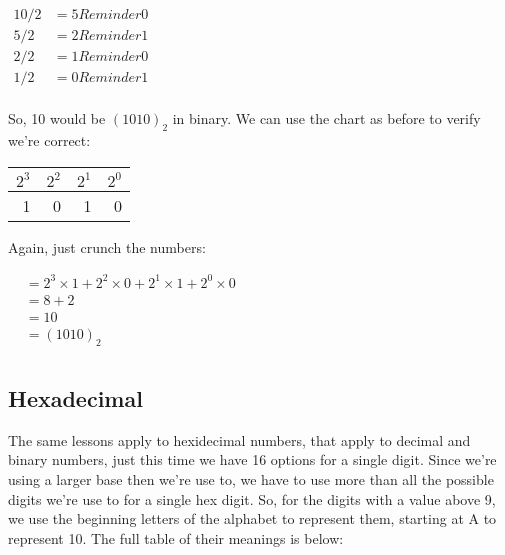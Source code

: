 \begin{center}
  \begin{math}
    \begin{aligned}
10/2 &= 5 Reminder 0 \\
5/2 &= 2 Reminder 1 \\
2/2 &= 1 Reminder 0 \\
1/2 &= 0 Reminder 1 \\
    \end{aligned}
  \end{math}
\end{center}

So, 10 would be $(1010)_2$ in binary. We can use the chart as before to verify
we're correct:

\begin{center}
  \begin{tabular}{r | r | r | r}
    $2^3$ & $2^2$ & $2^1$ & $2^0$ \\
    \hline
        1 &     0 &    1  &     0 \\
  \end{tabular}
\end{center}

Again, just crunch the numbers:

\begin{center}
  \begin{math}
    \begin{aligned}
&= 2^3 \times 1 + 2^2 \times 0 + 2^1 \times 1 + 2^0 \times 0 \\
&= 8 + 2 \\
&= 10 \\
&= (1010)_2 \\
    \end{aligned}
  \end{math}
\end{center}

\subsection{Hexadecimal}

The same lessons apply to hexidecimal numbers, that apply to decimal and binary
numbers, just this time we have 16 options for a single digit. Since we're
using a larger base then we're use to, we have to use more than all the possible
digits we're use to for a single hex digit. So, for the digits with a value
above 9, we use the beginning letters of the alphabet to represent them,
starting at A to represent 10. The full table of their meanings is below:

